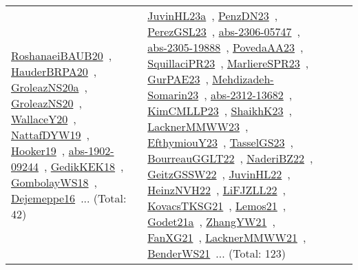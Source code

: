{\begin{longtable}{lp{3cm}>{\raggedright\arraybackslash}p{6cm}>{\raggedright\arraybackslash}p{6cm}>{\raggedright\arraybackslash}p{8cm}}
\href{../works/RoshanaeiBAUB20.pdf}{RoshanaeiBAUB20}~\cite{RoshanaeiBAUB20}, \href{../works/HauderBRPA20.pdf}{HauderBRPA20}~\cite{HauderBRPA20}, \href{../works/GroleazNS20a.pdf}{GroleazNS20a}~\cite{GroleazNS20a}, \href{../works/GroleazNS20.pdf}{GroleazNS20}~\cite{GroleazNS20}, \href{../works/WallaceY20.pdf}{WallaceY20}~\cite{WallaceY20}, \href{../works/NattafDYW19.pdf}{NattafDYW19}~\cite{NattafDYW19}, \href{../works/Hooker19.pdf}{Hooker19}~\cite{Hooker19}, \href{../works/abs-1902-09244.pdf}{abs-1902-09244}~\cite{abs-1902-09244}, \href{../works/GedikKEK18.pdf}{GedikKEK18}~\cite{GedikKEK18}, \href{../works/GombolayWS18.pdf}{GombolayWS18}~\cite{GombolayWS18}, \href{../works/Dejemeppe16.pdf}{Dejemeppe16}~\cite{Dejemeppe16}... (Total: 42) & \href{../works/JuvinHL23a.pdf}{JuvinHL23a}~\cite{JuvinHL23a}, \href{../works/PenzDN23.pdf}{PenzDN23}~\cite{PenzDN23}, \href{../works/PerezGSL23.pdf}{PerezGSL23}~\cite{PerezGSL23}, \href{../works/abs-2306-05747.pdf}{abs-2306-05747}~\cite{abs-2306-05747}, \href{../works/abs-2305-19888.pdf}{abs-2305-19888}~\cite{abs-2305-19888}, \href{../works/PovedaAA23.pdf}{PovedaAA23}~\cite{PovedaAA23}, \href{../works/SquillaciPR23.pdf}{SquillaciPR23}~\cite{SquillaciPR23}, \href{../works/MarliereSPR23.pdf}{MarliereSPR23}~\cite{MarliereSPR23}, \href{../works/GurPAE23.pdf}{GurPAE23}~\cite{GurPAE23}, \href{../works/Mehdizadeh-Somarin23.pdf}{Mehdizadeh-Somarin23}~\cite{Mehdizadeh-Somarin23}, \href{../works/abs-2312-13682.pdf}{abs-2312-13682}~\cite{abs-2312-13682}, \href{../works/KimCMLLP23.pdf}{KimCMLLP23}~\cite{KimCMLLP23}, \href{../works/ShaikhK23.pdf}{ShaikhK23}~\cite{ShaikhK23}, \href{../works/LacknerMMWW23.pdf}{LacknerMMWW23}~\cite{LacknerMMWW23}, \href{../works/EfthymiouY23.pdf}{EfthymiouY23}~\cite{EfthymiouY23}, \href{../works/TasselGS23.pdf}{TasselGS23}~\cite{TasselGS23}, \href{../works/BourreauGGLT22.pdf}{BourreauGGLT22}~\cite{BourreauGGLT22}, \href{../works/NaderiBZ22.pdf}{NaderiBZ22}~\cite{NaderiBZ22}, \href{../works/GeitzGSSW22.pdf}{GeitzGSSW22}~\cite{GeitzGSSW22}, \href{../works/JuvinHL22.pdf}{JuvinHL22}~\cite{JuvinHL22}, \href{../works/HeinzNVH22.pdf}{HeinzNVH22}~\cite{HeinzNVH22}, \href{../works/LiFJZLL22.pdf}{LiFJZLL22}~\cite{LiFJZLL22}, \href{../works/KovacsTKSG21.pdf}{KovacsTKSG21}~\cite{KovacsTKSG21}, \href{../works/Lemos21.pdf}{Lemos21}~\cite{Lemos21}, \href{../works/Godet21a.pdf}{Godet21a}~\cite{Godet21a}, \href{../works/ZhangYW21.pdf}{ZhangYW21}~\cite{ZhangYW21}, \href{../works/FanXG21.pdf}{FanXG21}~\cite{FanXG21}, \href{../works/LacknerMMWW21.pdf}{LacknerMMWW21}~\cite{LacknerMMWW21}, \href{../works/BenderWS21.pdf}{BenderWS21}~\cite{BenderWS21}... (Total: 123)\\

\end{longtable}}
